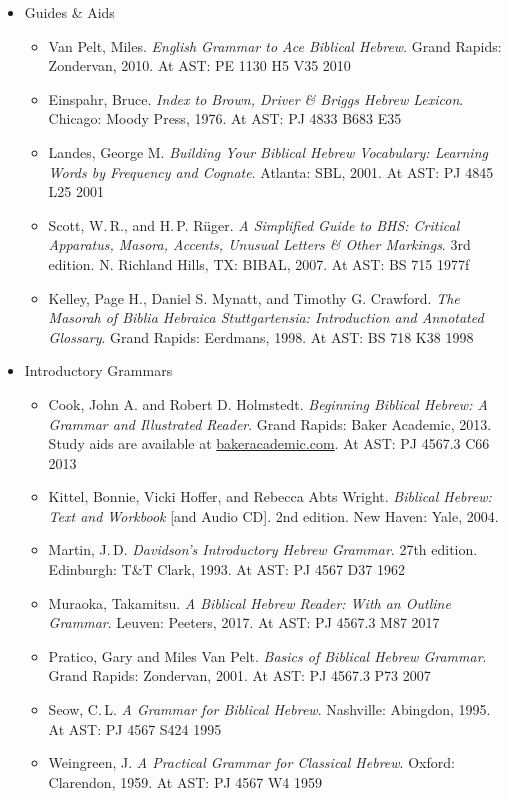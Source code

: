 \documentclass[titlepage]{article}
\begin{document}
\begin{itemize}
  \item Guides \& Aids

    \begin{itemize}
      \item
        Van Pelt, Miles. \emph{English Grammar to Ace Biblical Hebrew}.
        Grand Rapids: Zondervan, 2010. At AST: PE 1130 H5 V35 2010
      \item
        Einspahr, Bruce. \emph{Index to Brown, Driver \& Briggs Hebrew Lexicon}.
        Chicago: Moody Press, 1976. At AST: PJ 4833 B683 E35
      \item
        Landes, George M. \emph{Building Your Biblical Hebrew
        Vocabulary: Learning Words by Frequency and Cognate}.
        Atlanta: SBL, 2001. At AST: PJ 4845 L25 2001
      \item
        Scott, W.\,R., and H.\,P. Rüger. \emph{A Simplified Guide to BHS:
        Critical Apparatus, Masora, Accents, Unusual Letters \& Other
        Markings}. 3rd edition. N. Richland Hills, TX: BIBAL, 2007.
        At AST: BS 715 1977f
      \item
        Kelley, Page H., Daniel S. Mynatt, and Timothy G. Crawford.
        \emph{The Masorah of Biblia Hebraica Stuttgartensia:
        Introduction and Annotated Glossary}.
        Grand Rapids: Eerdmans, 1998. At AST: BS 718 K38 1998
    \end{itemize}

  \item Introductory Grammars

    \begin{itemize}
      \item
        Cook, John A. and Robert D. Holmstedt.
        \emph{Beginning Biblical Hebrew: A Grammar and Illustrated Reader}.
        Grand Rapids: Baker Academic, 2013.
        Study aids are available at \href{http://www.bakerpublishinggroup.com/books/beginning-biblical-hebrew/5629/students/esources}{bakeracademic.com}.
        At AST: PJ 4567.3 C66 2013
      \item
        Kittel, Bonnie, Vicki Hoffer, and Rebecca Abts Wright.
        \emph{Biblical Hebrew: Text and Workbook} [and Audio CD].
        2nd edition. New Haven: Yale, 2004.
      \item
        Martin, J.\,D. \emph{Davidson’s Introductory Hebrew Grammar}.
        27th edition. Edinburgh: T\&T Clark, 1993. At AST: PJ 4567 D37 1962
      \item
        Muraoka, Takamitsu.
        \emph{A Biblical Hebrew Reader: With an Outline Grammar}.
        Leuven: Peeters, 2017. At AST: PJ 4567.3 M87 2017
      \item
        Pratico, Gary and Miles Van Pelt. \emph{Basics of Biblical Hebrew Grammar}.
        Grand Rapids: Zondervan, 2001. At AST: PJ 4567.3 P73 2007
      \item
        Seow, C.\,L. \emph{A Grammar for Biblical Hebrew}.
        Nashville: Abingdon, 1995. At AST: PJ 4567 S424 1995
      \item
        Weingreen, J. \emph{A Practical Grammar for Classical Hebrew}.
        Oxford: Clarendon, 1959. At AST: PJ 4567 W4 1959
    \end{itemize}



\end{itemize}
\end{document}
